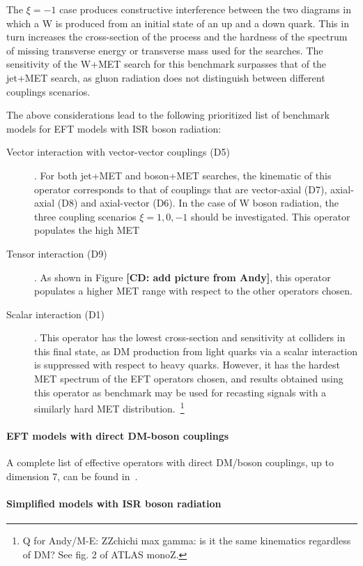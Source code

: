 The $\xi=-1$ case produces constructive interference between the two diagrams in which a W is produced from an initial state of an up and a down quark. This in turn increases the cross-section of the process and the hardness of the spectrum of missing transverse energy or transverse mass used for the searches. The sensitivity of the W+MET search for this benchmark surpasses that of the jet+MET search, as gluon radiation does not distinguish between different couplings scenarios. 

The above considerations lead to the following prioritized list of benchmark models for EFT models with ISR boson radiation: 

\begin{description}
 \item[Vector interaction with vector-vector couplings (D5)]. For both jet+MET and boson+MET searches, the kinematic of this operator corresponds to that of couplings that are vector-axial (D7), axial-axial (D8) and axial-vector (D6). In the case of W boson radiation, the three coupling scenarios $\xi=1,0,-1$ should be investigated. This operator populates the high MET
 \item[Tensor interaction (D9)]. As shown in Figure \textbf{[CD: add picture from Andy]}, this operator populates a higher MET range with respect to the other operators chosen. 
 \item[Scalar interaction (D1)]. This operator has the lowest cross-section and sensitivity at colliders in this final state, as DM production from light quarks via a scalar interaction is suppressed with respect to heavy quarks. However, it has the hardest MET spectrum of the EFT operators chosen, and results obtained using this operator as benchmark may be used for recasting signals with a similarly hard MET distribution.~\footnote{Q for Andy/M-E: ZZchichi max gamma: is it the same kinematics regardless of DM? See fig. 2 of ATLAS monoZ.}
\end{description}

\paragraph{EFT models with direct DM-boson couplings}

A complete list of effective operators with direct DM/boson couplings, 
up to dimension 7, can be found in~\citep{Cotta:2012nj}.

\paragraph{Simplified models with ISR boson radiation}

